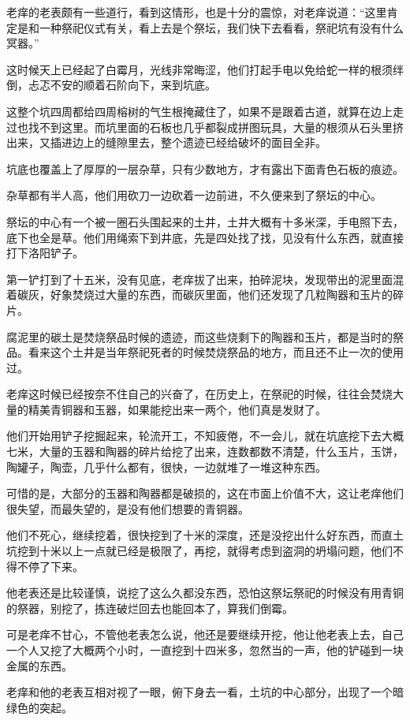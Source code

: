 老痒的老表颇有一些道行，看到这情形，也是十分的震惊，对老痒说道：“这里肯定是和一种祭祀仪式有关，看上去是个祭坛，我们快下去看看，祭祀坑有没有什么冥器。”

这时候天上已经起了白霉月，光线非常晦涩，他们打起手电以免给蛇一样的根须绊倒，忐忑不安的顺着石阶向下，来到坑底。

这整个坑四周都给四周榕树的气生根掩藏住了，如果不是跟着古道，就算在边上走过也找不到这里。而坑里面的石板也几乎都裂成拼图玩具，大量的根须从石头里挤出来，又插进边上的缝隙里去，整个遗迹已经给破坏的面目全非。

坑底也覆盖上了厚厚的一层杂草，只有少数地方，才有露出下面青色石板的痕迹。

杂草都有半人高，他们用砍刀一边砍着一边前进，不久便来到了祭坛的中心。

祭坛的中心有一个被一圈石头围起来的土井，土井大概有十多米深，手电照下去，底下也全是草。他们用绳索下到井底，先是四处找了找，见没有什么东西，就直接打下洛阳铲子。

第一铲打到了十五米，没有见底，老痒拔了出来，拍碎泥块，发现带出的泥里面混着碳灰，好象焚烧过大量的东西，而碳灰里面，他们还发现了几粒陶器和玉片的碎片。

腐泥里的碳土是焚烧祭品时候的遗迹，而这些烧剩下的陶器和玉片，都是当时的祭品。看来这个土井是当年祭祀死者的时候焚烧祭品的地方，而且还不止一次的使用过。

老痒这时候已经按奈不住自己的兴奋了，在历史上，在祭祀的时候，往往会焚烧大量的精美青铜器和玉器，如果能挖出来一两个，他们真是发财了。

他们开始用铲子挖掘起来，轮流开工，不知疲倦，不一会儿，就在坑底挖下去大概七米，大量的玉器和陶器的碎片给挖了出来，连数都数不清楚，什么玉片，玉饼，陶罐子，陶壶，几乎什么都有，很快，一边就堆了一堆这种东西。

可惜的是，大部分的玉器和陶器都是破损的，这在市面上价值不大，这让老痒他们很失望，而最失望的，是没有他们想要的青铜器。

他们不死心，继续挖着，很快挖到了十米的深度，还是没挖出什么好东西，而直土坑挖到十米以上一点就已经是极限了，再挖，就得考虑到盗洞的坍塌问题，他们不得不停了下来。

他老表还是比较谨慎，说挖了这么久都没东西，恐怕这祭坛祭祀的时候没有用青铜的祭器，别挖了，拣连破烂回去也能回本了，算我们倒霉。

可是老痒不甘心，不管他老表怎么说，他还是要继续开挖，他让他老表上去，自己一个人又挖了大概两个小时，一直挖到十四米多，忽然当的一声，他的铲碰到一块金属的东西。

老痒和他的老表互相对视了一眼，俯下身去一看，土坑的中心部分，出现了一个暗绿色的突起。

